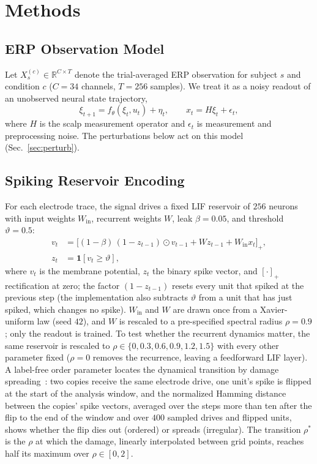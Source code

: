 \documentclass[conference]{IEEEtran}
\newcommand{\R}{\mathbb{R}}
\newcommand{\Ind}{\mathbf{1}}
\begin{document}
\section{Methods}
\label{sec:methods}
\subsection{ERP Observation Model}
Let $X_s^{(c)}\in\R^{C\times T}$ denote the trial-averaged ERP observation for subject $s$ and condition $c$ ($C=34$ channels, $T=256$ samples). We treat it as a noisy readout of an unobserved neural state trajectory,
\begin{equation}\label{eq:obs}
    \xi_{t+1}=f_\theta(\xi_t,u_t)+\eta_t,\qquad
    x_t=H\xi_t+\epsilon_t,
\end{equation}
where $H$ is the scalp measurement operator and $\epsilon_t$ is measurement and preprocessing noise. The perturbations below act on this model (Sec.~\ref{sec:perturb}).

\subsection{Spiking Reservoir Encoding}
For each electrode trace, the signal drives a fixed LIF reservoir of $256$ neurons with input weights $W_{\mathrm{in}}$, recurrent weights $W$, leak $\beta=0.05$, and threshold $\vartheta=0.5$:
\begin{align}
    v_{t} &= \big[(1-\beta)\,(1-z_{t-1})\odot v_{t-1} + W z_{t-1} + W_{\mathrm{in}}x_t\big]_+, \\
    z_{t} &= \Ind[v_{t}\geq \vartheta],
\end{align}
where $v_t$ is the membrane potential, $z_t$ the binary spike vector, and $[\cdot]_+$ rectification at zero; the factor $(1-z_{t-1})$ resets every unit that spiked at the previous step (the implementation also subtracts $\vartheta$ from a unit that has just spiked, which changes no spike). $W_{\mathrm{in}}$ and $W$ are drawn once from a Xavier-uniform law (seed $42$), and $W$ is rescaled to a pre-specified spectral radius $\rho=0.9$; only the readout is trained. To test whether the recurrent dynamics matter, the same reservoir is rescaled to $\rho\in\{0,0.3,0.6,0.9,1.2,1.5\}$ with every other parameter fixed ($\rho=0$ removes the recurrence, leaving a feedforward LIF layer). A label-free order parameter locates the dynamical transition by damage spreading~\cite{bertschinger2004realtime}: two copies receive the same electrode drive, one unit's spike is flipped at the start of the analysis window, and the normalized Hamming distance between the copies' spike vectors, averaged over the steps more than ten after the flip to the end of the window and over $400$ sampled drives and flipped units, shows whether the flip dies out (ordered) or spreads (irregular). The transition $\rho^\ast$ is the $\rho$ at which the damage, linearly interpolated between grid points, reaches half its maximum over $\rho\in[0,2]$.
\end{document}
